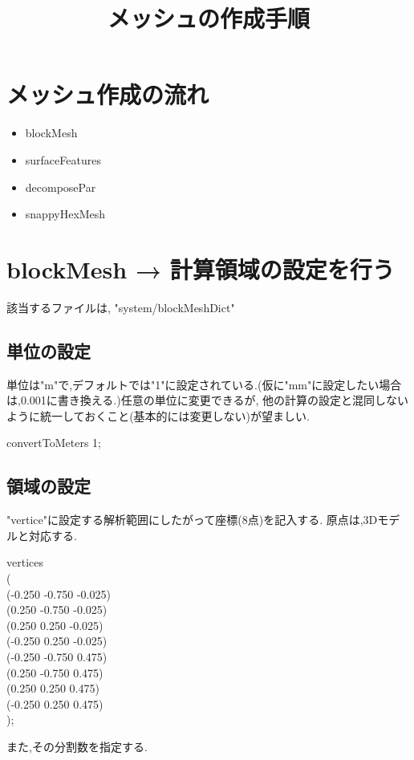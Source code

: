\documentclass[a4paper]{jsarticle}
\author{}
\title{メッシュの作成手順}
\date{}
\begin{document}
\maketitle
\section{\large メッシュ作成の流れ}
\begin{itemize}
    \item blockMesh
    \item surfaceFeatures
    \item decomposePar
    \item snappyHexMesh
\end{itemize}
\section{\large blockMesh → 計算領域の設定を行う}
該当するファイルは, "system/blockMeshDict"
\subsection{単位の設定}
単位は"m"で,デフォルトでは"1"に設定されている.(仮に"mm"に設定したい場合は,0.001に書き換える.)任意の単位に変更できるが,
他の計算の設定と混同しないように統一しておくこと(基本的には変更しない)が望ましい.
\begin{framed}
    \begin{center}
        convertToMeters 1;
    \end{center}
\end{framed}
\subsection{領域の設定}
"vertice"に設定する解析範囲にしたがって座標(8点)を記入する.
原点は,3Dモデルと対応する.
\begin{framed}
    \begin{center}
        {
            vertices\\
            (\\
            \qquad (-0.250 -0.750 -0.025)\\
            \qquad (0.250 -0.750 -0.025)\\
            \qquad (0.250 0.250 -0.025)\\
            \qquad (-0.250 0.250 -0.025)\\
            \qquad (-0.250 -0.750 0.475)\\
            \qquad (0.250 -0.750 0.475)\\
            \qquad (0.250 0.250 0.475)\\
            \qquad (-0.250 0.250 0.475)\\
            );
        }
    \end{center}
\end{framed}

また,その分割数を指定する.
\end{document}
